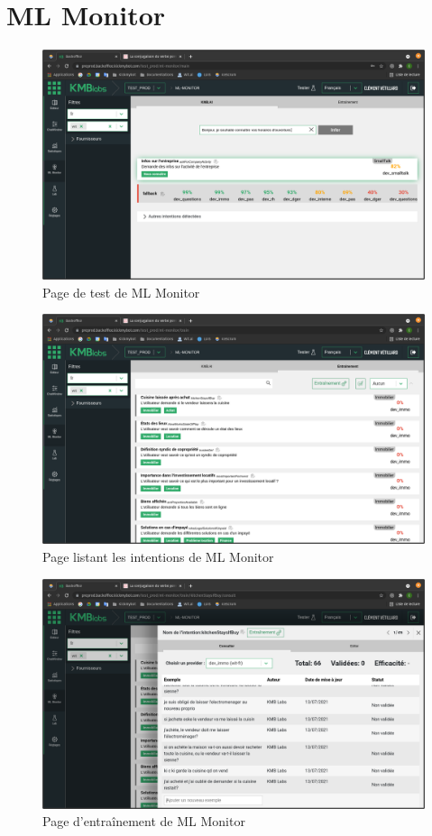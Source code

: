 \documentclass[12pt,a4paper,oneside]{scrreprt}
\begin{document}
\newpage
\section{ML Monitor}

\begin{figure}[!ht]
	\centering
	\includegraphics[width=\textwidth]{pictures/mlmonitor_test.png}
	\caption{Page de test de ML Monitor}
	\label{fig:mlmonitor_test}
\end{figure}

\begin{figure}[!ht]
	\centering
	\includegraphics[width=\textwidth]{pictures/mlmonitor_intentions.png}
	\caption{Page listant les intentions de ML Monitor}
	\label{fig:mlmonitor_intentions}
\end{figure}

\begin{figure}[!ht]
	\centering
	\includegraphics[width=\textwidth]{pictures/mlmonitor_training.png}
	\caption{Page d'entraînement de ML Monitor}
	\label{fig:mlmonitor_training}
\end{figure}
\end{document}
